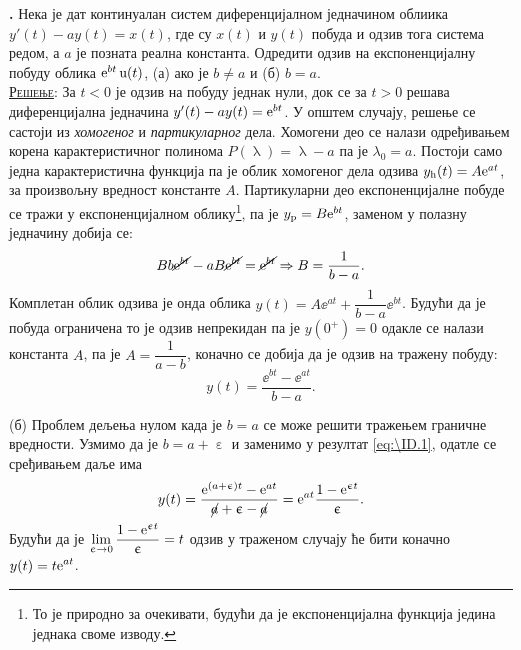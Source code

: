 \textbf{\ID.} Нека је дат континуалан систем диференцијалном једначином облиика 
${y'(t) - ay(t)  = x(t)}$, где су $x(t)$ и $y(t)$ побуда и одзив тога система редом, а $a$ је позната
реална константа. Одредити одзив на експоненцијалну побуду облика 
${\rm e}^{bt} \, {\rm u}(t)$, (а) ако је $b \neq a$ и (б) $b = a$. \\[5mm]

\textsc{\underline{Решење}}: За $t < 0$ је одзив на побуду једнак нули, док се 
за $t > 0$ решава диференцијална једначина 
${y'(t) - ay(t)  = {\rm e}^{bt}}$. У општем случају, решење се састоји из 
\textit{хомогеног} и \textit{партикуларног} дела. Хомогени део се налази одређивањем корена 
карактеристичног полинома $P(\uplambda) = \uplambda - a$ па је $\lambda_0 = a$. Постоји само 
једна карактеристична функција па је облик хомогеног дела одзива 
$y_{\rm h}(t) = A {\rm e}^{at}$, за произвољну вредност константе $A$. Партикуларни део експоненцијалне побуде се тражи у 
експоненцијалном облику\footnote{То је природно за очекивати, будући да је експоненцијална функција
једина једнака своме изводу.}, па је $y_{\rm p} = B{\rm e}^{bt}$, заменом у полазну једначину добија се:
\begin{equation}
    Bb\cancel{{\rm e}^{bt}} - aB\cancel{{\rm e}^{bt}} = \cancel{{\rm e}^{bt}} \Rightarrow
    B = \dfrac{1}{b - a}.
\end{equation}
Комплетан облик одзива је онда облика $y(t) = A\ee^{at} + \dfrac{1}{b-a} \ee^{bt}$. Будући да је
побуда ограничена то је одзив непрекидан па је $y(0^+) = 0$ одакле се налази константа $A$, 
па је $A = \dfrac{1}{a - b}$, коначно се добија да је одзив на тражену побуду:
\begin{equation}
    y(t) = \dfrac{\ee^{bt} - \ee^{at}}{b - a}.
    \label{eq:\ID.1}
\end{equation}

(б) 
Проблем дељења нулом када је $b=a$ се може решити тражењем граничне вредности. 
Узмимо да је $b = a + \upepsilon$ 
и заменимо у резултат \ref{eq:\ID.1}, одатле се сређивањем даље има
\begin{equation}
    y(t) = \dfrac{{\rm e}^{(a + \upepsilon)t} - {\rm e}^{at}}{\cancel{a} + \upepsilon - \cancel{a}} = 
    {\rm e}^{at} \dfrac{1 -{\rm e}^{\upepsilon t}}{\upepsilon}.
\end{equation}
Будући да је $\displaystyle \lim_{\upepsilon\to 0} \dfrac{1 -{\rm e}^{\upepsilon t}}{\upepsilon} = t$ одзив
у траженом случају ће бити коначно 
$\displaystyle y(t) = t {\rm e}^{at}$.